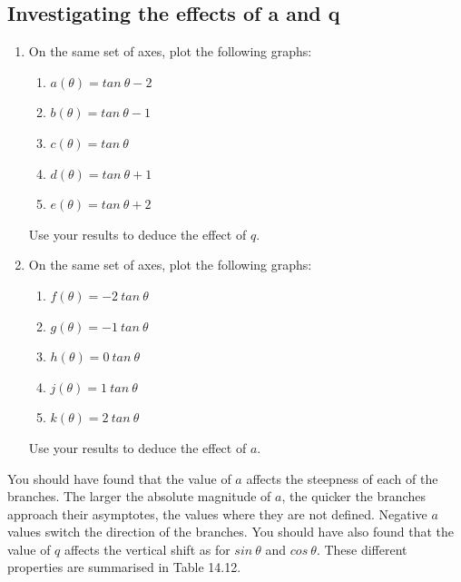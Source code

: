 \subsection*{Investigating the effects of a and q}
\nopagebreak
\begin{enumerate}[noitemsep, label=\textbf{\arabic*}. ] 
\item On the same set of axes, plot the following graphs:
\begin{enumerate}[noitemsep, label=\textbf{\alph*}. ] 
\item $a(\theta )=tan~\theta -2$
\item $b(\theta )=tan~\theta -1$
\item $c(\theta )=tan~\theta $
\item $d(\theta )=tan~\theta +1$
\item $e(\theta )=tan~\theta +2$\end{enumerate}
Use your results to deduce the effect of $q$.
\item On the same set of axes, plot the following graphs:
\begin{enumerate}[noitemsep, label=\textbf{\alph*}. ] 
\item $f(\theta )=-2~tan~\theta $
\item $g(\theta )=-1~tan~\theta $
\item $h(\theta )=0~tan~\theta $
\item $j(\theta )=1~tan~\theta $
\item $k(\theta )=2~tan~\theta $\end{enumerate}
Use your results to deduce the effect of $a$.
\end{enumerate}
You should have found that the value of $a$ affects the steepness of each of the branches. The larger the absolute magnitude of $a$, the quicker the branches approach their asymptotes, the values where they are not defined. Negative $a$ values switch the direction of the branches.
You should have also found that the value of $q$ affects the vertical shift as for $sin~\theta $ and $cos~\theta $.
These different properties are summarised in Table 14.12.\par 
